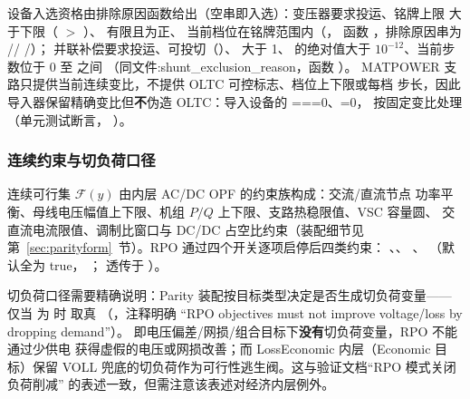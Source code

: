 设备入选资格由排除原因函数给出（空串即入选）：变压器要求投运、铭牌上限
大于下限（ $>$ ）、
有限且为正、
当前档位在铭牌范围内（，
函数 ，排除原因串为
/\allowbreak{}/\allowbreak
{}/\allowbreak{}）；
并联补偿要求投运、可投切（）、 大于 1、
 的绝对值大于 $10^{-12}$、当前步数位于 0 至
 之间
（同文件:shunt\_exclusion\_reason，函数 ）。
MATPOWER 支路只提供当前连续变比，不提供 OLTC 可控标志、档位上下限或每档
步长，因此导入器保留精确变比但\textbf{不}伪造 OLTC：导入设备的
===0、=0，
按固定变比处理（单元测试断言，
）。

\subsubsection*{连续约束与切负荷口径}
连续可行集 $\mathcal{F}(y)$ 由内层 AC/DC OPF 的约束族构成：交流/直流节点
功率平衡、母线电压幅值上下限、机组 $P/Q$ 上下限、支路热稳限值、VSC 容量圆、
交直流电流限值、调制比窗口与 DC/DC 占空比约束（装配细节见
第~\ref{sec:parityform}~节）。RPO 通过四个开关逐项启停后四类约束：
、、
、
（默认全为 true，
；
透传于 ）。

切负荷口径需要精确说明：Parity 装配按目标类型决定是否生成切负荷变量——
仅当  为  时
 取真
（，注释明确
“RPO objectives must not improve voltage/loss by dropping demand”）。
即电压偏差/网损/组合目标下\textbf{没有}切负荷变量，RPO 不能通过少供电
获得虚假的电压或网损改善；而 LossEconomic 内层（Economic 目标）保留
VOLL 兜底的切负荷作为可行性逃生阀。这与验证文档“RPO 模式关闭负荷削减”
的表述一致，但需注意该表述对经济内层例外。


